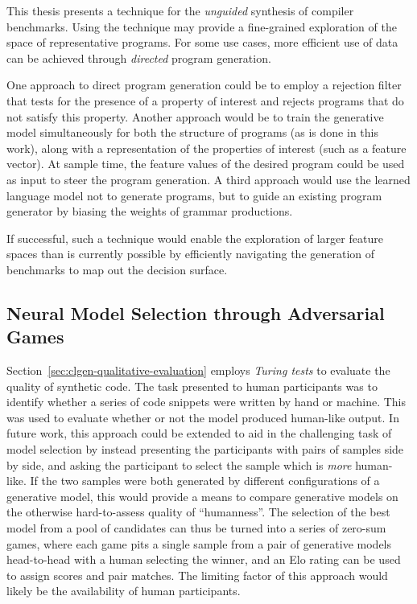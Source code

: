 This thesis presents a technique for the \emph{unguided} synthesis of compiler benchmarks. Using the technique may provide a fine-grained exploration of the space of representative programs. For some use cases, more efficient use of data can be achieved through \emph{directed} program generation.

One approach to direct program generation could be to employ a rejection filter that tests for the presence of a property of interest and rejects programs that do not satisfy this property. Another approach would be to train the generative model simultaneously for both the structure of programs (as is done in this work), along with a representation of the properties of interest (such as a feature vector). At sample time, the feature values of the desired program could be used as input to steer the program generation. A third approach would use the learned language model not to generate programs, but to guide an existing program generator by biasing the weights of grammar productions.

If successful, such a technique would enable the exploration of larger feature spaces than is currently possible by efficiently navigating the generation of benchmarks to map out the decision surface.


\subsection{Neural Model Selection through Adversarial Games}

Section~\ref{sec:clgen-qualitative-evaluation} employs \emph{Turing tests} to evaluate the quality of synthetic code. The task presented to human participants was to identify whether a series of code snippets were written by hand or machine. This was used to evaluate whether or not the model produced human-like output. In future work, this approach could be extended to aid in the challenging task of model selection by instead presenting the participants with pairs of samples side by side, and asking the participant to select the sample which is \emph{more} human-like. If the two samples were both generated by different configurations of a generative model, this would provide a means to compare generative models on the otherwise hard-to-assess quality of ``humanness''. The selection of the best model from a pool of candidates can thus be turned into a series of zero-sum games, where each game pits a single sample from a pair of generative models head-to-head with a human selecting the winner, and an Elo rating can be used to assign scores and pair matches. The limiting factor of this approach would likely be the availability of human participants.


